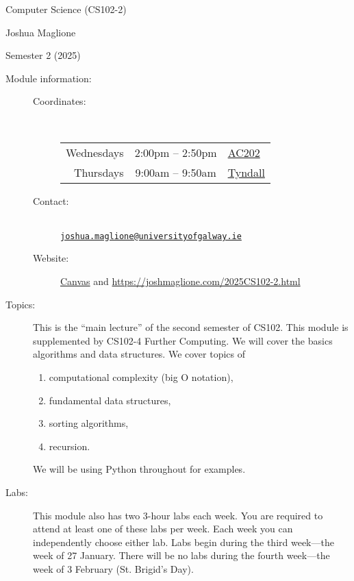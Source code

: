 \documentclass[a4paper, 12pt]{article}
\begin{document}
\pagestyle{empty}

\begin{center}
{\Large Computer Science (CS102-2)} 

\vspace{0.25cm}

{\large Joshua Maglione}

\vspace{0.25cm}

Semester 2 (2025)
\end{center}

\vspace{0.5cm}

\begin{description}
    \item[Module information:] \hfill
    \begin{description}
      \item[Coordinates:] \hfill \\ [0.5em]
        \begin{tabular}{rcl}
          Wednesdays & 2:00pm -- 2:50pm & \href{https://clients.mapsindoors.com/nuigalwayweb/9167eab0dc78437c93c76b57/details/22185f1db04149f3ab4bac48}{AC202} \\ Thursdays & 9:00am -- 9:50am & \href{https://clients.mapsindoors.com/nuigalwayweb/9167eab0dc78437c93c76b57/details/76ccb06aa36c4758823836e7}{Tyndall}
        \end{tabular}
      \item[Contact:] \hfill \\ \href{mailto:joshua.maglione@universityofgalway.ie}{\texttt{joshua.maglione@universityofgalway.ie}}
      \item[Website:] \href{https://universityofgalway.instructure.com/}{\textsf{Canvas}} and \url{https://joshmaglione.com/2025CS102-2.html} 
    \end{description} 
    \vspace{1cm}
    \item[Topics:] This is the ``main lecture'' of the second semester of CS102. This module is supplemented by CS102-4 Further Computing. We will cover the basics algorithms and data structures. We cover topics of
    \begin{enumerate} 
      \item computational complexity (big O notation),
      \item fundamental data structures,
      \item sorting algorithms,
      \item recursion.
    \end{enumerate} 
    We will be using Python throughout for examples.
    \vspace{1cm}
    \item[Labs:] This module also has two 3-hour labs each week. You are required to attend at least one of these labs per week. Each week you can independently choose either lab. Labs begin during the third week---the week of 27 January. There will be no labs during the fourth week---the week of 3 February (St. Brigid's Day).
    

\end{description}
\end{document}
